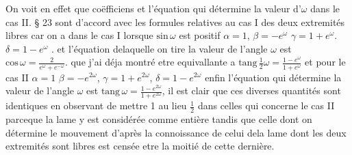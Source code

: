 \documentclass[11pt,a4paper]{article}
\begin{document}
On voit en effet que   coëfficiens et l'équation qui détermine
la valeur d'$\omega$ dans le cas II. § 23  sont d'accord avec les formules
relatives au cas I  des deux extremités libres  car on a dans le
cas I lorsque $\text{sin}\,\omega$ est positif $\alpha = 1$, $\beta = -e^{\omega}$ $\gamma = 1+e^{\omega}$. $\delta = 1-e^{\omega}$
 . et l'équation delaquelle on tire la valeur de l'angle
$\omega$ est $\text{cos}\,\omega = \frac{2}{e^{\omega}+e^{-\omega}}$. que j'ai déja montré etre equivallante a
$\text{tang}\,\frac{1}{2}\omega = \frac{1-e^{\omega}}{1+e^{\omega}}$ et pour le cas II $\alpha = 1$ $\beta = -e^{2\omega}$, $\gamma = 1+e^{2\omega}$, $\delta = 1-e^{2\omega}$
enfin l'équation qui détermine la valeur de l'angle $\omega$ est
$\text{tang}\,\omega = \frac{1-e^{2\omega}}{1+e^{2\omega}}$, il est clair que ces diverses quantités sont
identiques en observant  de mettre 1 au lieu $\frac{1}{2}$ dans celles
qui concerne le cas II parceque la lame y est considérée comme
entière tandis que celle dont on détermine le mouvement d'après
la connoissance de celui dela lame dont les deux extremités
sont libres est censée etre la moitié de cette dernière.
\end{document}
